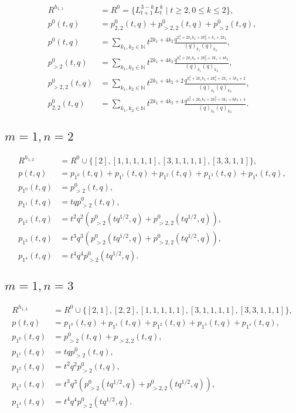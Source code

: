 \documentclass[a4paper, 12pt, reqno]{amsart}
\begin{document}
\begin{align*}
  R^{h_{1, 1}} &= R^0 = \{L_{t + 1}^{3 - k}L_t^k \mid t \ge 2, 0 \le k \le 2\}, \\
  p^0(t, q) &= p^0_{2, 2}(t, q) + p^0_{>2, 2}(t, q) + p^0_{>2}(t, q), \\
  p^0(t, q) &= \sum_{k_1, k_2 \in \mathbb{N}}t^{2k_1 + 4k_2}\frac{q^{k_1^2 + 2k_1k_2 + 2k_2^2 + k_1 + 2k_2}}{(q)_{k_1}(q)_{k_2}}, \\
  p^0_{>2}(t, q) &= \sum_{k_1, k_2 \in \mathbb{N}}t^{2k_1 + 4k_2}\frac{q^{k_1^2 + 2k_1k_2 + 2k_2^2 + 2k_1 + 4k_2}}{(q)_{k_1}(q)_{k_2}}, \\
  p^0_{>2, 2}(t, q) &= \sum_{k_1, k_2 \in \mathbb{N}}t^{2k_1 + 4k_2 + 2}\frac{q^{k_1^2 + 2k_1k_2 + 2k_2^2 + 2k_1 + 5k_2 + 2}}{(q)_{k_1}(q)_{k_2}}, \\
  p^0_{2, 2}(t, q) &= \sum_{k_1, k_2 \in \mathbb{N}}t^{2k_1 + 4k_2 + 4}\frac{q^{k_1^2 + 2k_1k_2 + 2k_2^2 + 3k_1 + 6k_2 + 4}}{(q)_{k_1}(q)_{k_2}}.
\end{align*}

\subsection{$m = 1, n = 2$}
\label{sec:m-=-1-3}

\begin{align*}
  R^{h_{1, 2}} &= R^0 \cup \{[2], [1, 1, 1, 1, 1], [3, 1, 1, 1, 1], [3, 3, 1, 1]\}, \\
  p(t, q) &= p_{1^0}(t, q) + p_{1^1}(t, q) + p_{1^2}(t, q) + p_{1^3}(t, q) + p_{1^4}(t, q), \\
  p_{1^0}(t, q) &= p^0_{>2}(t, q), \\
  p_{1^1}(t, q) &= tqp^0_{>2}(t, q), \\
  p_{1^2}(t, q) &= t^2q^2(p^0_{>2}(tq^{1/2}, q) + p^0_{>2, 2}(tq^{1/2}, q)), \\
  p_{1^3}(t, q) &= t^3q^3(p^0_{>2}(tq^{1/2}, q) + p^0_{>2, 2}(tq^{1/2}, q)), \\
  p_{1^4}(t, q) &= t^4q^4p^0_{>2}(tq^{1/2}, q).
\end{align*}

\subsection{$m = 1, n = 3$}
\label{sec:m-=-1-4}

\begin{align*}
  R^{h_{1, 3}} &= R^0 \cup \{[2, 1], [2, 2], [1, 1, 1, 1, 1], [3, 1, 1, 1, 1], [3, 3, 1, 1, 1]\}, \\
  p(t, q) &= p_{1^0}(t, q) + p_{1^1}(t, q) + p_{1^2}(t, q) + p_{1^3}(t, q) + p_{1^4}(t, q), \\
  p_{1^0}(t, q) &= p^0_{>2}(t, q) + p_{>2, 2}(t, q), \\
  p_{1^1}(t, q) &= tqp^0_{>2}(t, q), \\
  p_{1^2}(t, q) &= t^2q^2p^0_{>2}(t, q), \\
  p_{1^3}(t, q) &= t^3q^3(p^0_{>2}(tq^{1/2}, q) + p^0_{>2, 2}(tq^{1/2}, q)), \\
  p_{1^4}(t, q) &= t^4q^4p^0_{>2}(tq^{1/2}, q).
\end{align*}
\end{document}
